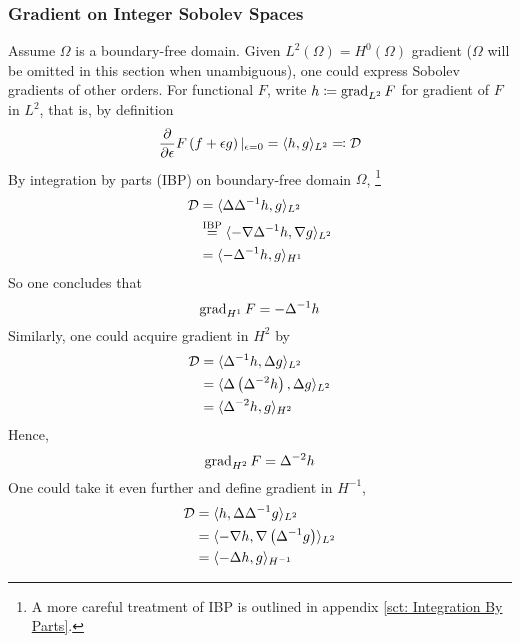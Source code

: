 \documentclass[../dissertation.tex]{subfiles}
\begin{document}
\subsubsection{Gradient on Integer Sobolev Spaces}
Assume $\Omega$ is a boundary-free domain.
Given $L^2(\Omega) = H^0(\Omega)$ gradient ($\Omega$ will be omitted in this section when unambiguous), one could express Sobolev gradients of other orders.
For functional $F$, write $h \coloneqq \operatorname{grad}_{L^2} F$ for gradient of $F$ in $L^2$, that is, by definition
\begin{equation}
    \frac{\partial}{\partial \epsilon} F \left( f + \epsilon g \right)|_{\epsilon = 0} = \langle h, g \rangle_{L^2} \eqqcolon \mathcal{D}
    \label{equ: L2 Gradient Explicit Form}
\end{equation}
By integration by parts (IBP) on boundary-free domain $\Omega$,
\footnote{A more careful treatment of IBP is outlined in appendix \ref{sct: Integration By Parts}.}
\begin{align*}
    \mathcal{D} &= \langle \Delta \Delta^{-1} h, g \rangle_{L^2} \\
    &\stackrel{\text{IBP}}{=} \langle -\nabla \Delta^{-1} h, \nabla g \rangle_{L^2} \\
    &= \langle -\Delta^{-1} h, g \rangle_{H^1}
\end{align*}
So one concludes that
\begin{equation}
    \operatorname{grad}_{H^1} F = -\Delta^{-1} h
    \label{equ: H1 Gradient}
\end{equation}
Similarly, one could acquire gradient in $H^2$ by
\begin{align*}
    \mathcal{D} &= \langle \Delta^{-1} h, \Delta g \rangle_{L^2} \\
    &= \langle \Delta \left( \Delta^{-2} h \right), \Delta g \rangle_{L^2} \\
    &= \langle \Delta^{-2} h, g \rangle_{H^2}
\end{align*}
Hence,
\begin{equation}
    \operatorname{grad}_{H^2} F = \Delta^{-2} h
    \label{equ: H2 Gradient}
\end{equation}
One could take it even further and define gradient in $H^{-1}$,
\begin{align*}
    \mathcal{D} &= \langle h, \Delta \Delta^{-1} g \rangle_{L^2} \\
    &= \langle -\nabla h, \nabla \left( \Delta^{-1} g \right) \rangle_{L^2} \\
    &= \langle -\Delta h, g \rangle_{H^{-1}}
\end{align*}
\end{document}
